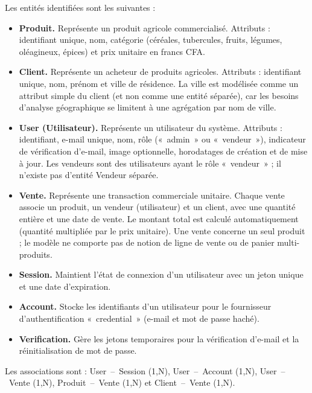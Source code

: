 \documentclass[11pt,a4paper]{report}
\begin{document}
Les entités identifiées sont les suivantes :
\begin{itemize}
  \item \textbf{Produit.} Représente un produit agricole commercialisé.
        Attributs : identifiant unique, nom, catégorie (céréales, tubercules,
        fruits, légumes, oléagineux, épices) et prix unitaire en francs CFA.
  \item \textbf{Client.} Représente un acheteur de produits agricoles.
        Attributs : identifiant unique, nom, prénom et ville de résidence. La
        ville est modélisée comme un attribut simple du client (et non comme une
        entité séparée), car les besoins d'analyse géographique se limitent à
        une agrégation par nom de ville.
  \item \textbf{User (Utilisateur).} Représente un utilisateur du système.
        Attributs : identifiant, e-mail unique, nom, rôle
        («~admin~» ou «~vendeur~»), indicateur de vérification d'e-mail, image
        optionnelle, horodatages de création et de mise à jour. Les vendeurs
        sont des utilisateurs ayant le rôle «~vendeur~» ; il n'existe pas
        d'entité Vendeur séparée.
  \item \textbf{Vente.} Représente une transaction commerciale unitaire. Chaque
        vente associe un produit, un vendeur (utilisateur) et un client, avec
        une quantité entière et une date de vente. Le montant total est calculé
        automatiquement (quantité multipliée par le prix unitaire). Une vente
        concerne un seul produit ; le modèle ne comporte pas de notion de ligne
        de vente ou de panier multi-produits.
  \item \textbf{Session.} Maintient l'état de connexion d'un utilisateur avec un
        jeton unique et une date d'expiration.
  \item \textbf{Account.} Stocke les identifiants d'un utilisateur pour le
        fournisseur d'authentification «~credential~» (e-mail et mot de passe
        haché).
  \item \textbf{Verification.} Gère les jetons temporaires pour la vérification
        d'e-mail et la réinitialisation de mot de passe.
\end{itemize}

Les associations sont : User~--~Session (1,N), User~--~Account (1,N),
User~--~Vente (1,N), Produit~--~Vente (1,N) et Client~--~Vente (1,N).
\end{document}
